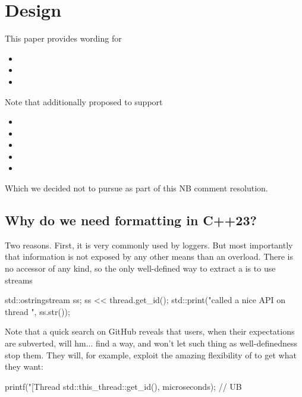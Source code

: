 \documentclass{wg21}
\begin{document}
\section{Design}

This paper provides wording for
\begin{itemize}
\item {}
\item {}
\item {}
\end{itemize}

Note that  additionally proposed to support

\begin{itemize}
\item {}
\item {}
\item {}
\item {}
\item {}
\end{itemize}

Which we decided not to pursue as part of this NB comment resolution.

\subsection{Why do we need  formatting in C++23?}

Two reasons. First, it is very commonly used by loggers. But most importantly that information is not exposed by any other means
than an  \tcode{<<} overload. There is no accessor of any kind, so the only well-defined way to extract a 
is to use streams

\begin{colorblock}
std::ostringstream ss;
ss << thread.get_id();
std::print("called a nice API on thread {}", ss.str());
\end{colorblock}

Note that a quick search on GitHub reveals that users, when their expectations are subverted,  will hm... find a way, and won't let such thing as well-definedness stop them. They will, for example, exploit the amazing flexibility of 
to get what they want:

\begin{colorblock}
printf("[Thread %
    std::this_thread::get_id(), microseconds); // UB
\end{colorblock}
\end{document}
